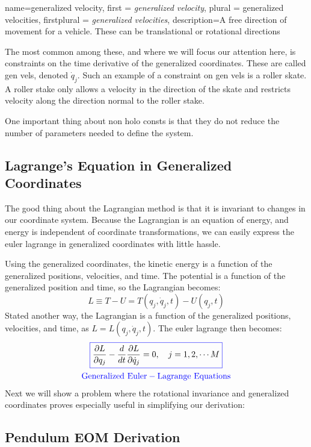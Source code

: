 \documentclass[12pt]{report}
\begin{document}
{
    name=generalized velocity,
    first = {\textit{generalized velocity}},
    plural = {generalized velocities},
    firstplural = {\textit{generalized velocities}},
    description={A free direction of movement for a vehicle. These can be translational or rotational directions}
}

The most common among these, and where we will focus our attention here, is constraints on the time derivative of the generalized coordinates. These are called \glspl{gen vel}, denoted $\dot{q}_j$. Such an example of a constraint on \glspl{gen vel} is a roller skate. A roller stake only allows a velocity in the direction of the skate and restricts velocity along the direction normal to the roller stake.

One important thing about \glspl{non holo const} is that they do not reduce the number of parameters needed to define the system. 

\subsection{Lagrange's Equation in Generalized Coordinates}

The good thing about the \gls{Lagrangian} method is that it is invariant to changes in our coordinate system. Because the \gls{Lagrangian} is an equation of energy, and energy is independent of coordinate transformations, we can easily express the \gls{euler lagrange} in generalized coordinates with little hassle.

Using the generalized coordinates, the kinetic energy is a function of the generalized positions, velocities, and time. The potential is a function of the generalized position and time, so the \gls{Lagrangian} becomes:
$$L\equiv T-U=T(q_j,\dot{q}_j,t)-U(q_j,t)$$
Stated another way, the \gls{Lagrangian} is a function of the generalized positions, velocities, and time, as $L=L(q_j,\dot{q}_j,t)$. The \gls{euler lagrange} then becomes:
\begin{gather}\label{eq:Euler-Lagrange General}
\color{blue}\boxed{\color{black}\frac{\partial L}{\partial q_j}-\frac{d}{dt}\frac{\partial L}{\partial \dot{q}_j}=0,\ \ \ j=1,2,\cdots M}\\
\mathrm{\color{blue}Generalized \ Euler-Lagrange \ Equations}
\end{gather}
Next we will show a problem where the rotational invariance and generalized coordinates proves especially useful in simplifying our derivation:
\subsection{Pendulum EOM Derivation}
\end{document}
